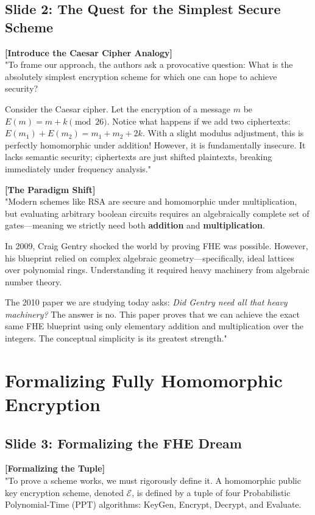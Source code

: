 \documentclass[11pt]{article}
\begin{document}
\subsection*{Slide 2: The Quest for the Simplest Secure Scheme}
\textbf{[Introduce the Caesar Cipher Analogy]} \\
"To frame our approach, the authors ask a provocative question: What is the absolutely simplest encryption scheme for which one can hope to achieve security? 

Consider the Caesar cipher. Let the encryption of a message $m$ be $E(m) = m + k \pmod{26}$. Notice what happens if we add two ciphertexts: $E(m_1) + E(m_2) = m_1 + m_2 + 2k$. With a slight modulus adjustment, this is perfectly homomorphic under addition! However, it is fundamentally insecure. It lacks semantic security; ciphertexts are just shifted plaintexts, breaking immediately under frequency analysis."

\textbf{[The Paradigm Shift]} \\
"Modern schemes like RSA are secure and homomorphic under multiplication, but evaluating arbitrary boolean circuits requires an algebraically complete set of gates---meaning we strictly need both \textbf{addition} and \textbf{multiplication}. 

In 2009, Craig Gentry shocked the world by proving FHE was possible. However, his blueprint relied on complex algebraic geometry---specifically, ideal lattices over polynomial rings. Understanding it required heavy machinery from algebraic number theory. 

The 2010 paper we are studying today asks: \textit{Did Gentry need all that heavy machinery?} The answer is no. This paper proves that we can achieve the exact same FHE blueprint using only elementary addition and multiplication over the integers. The conceptual simplicity is its greatest strength."

\section{Formalizing Fully Homomorphic Encryption}

\subsection*{Slide 3: Formalizing the FHE Dream}
\textbf{[Formalizing the Tuple]} \\
"To prove a scheme works, we must rigorously define it. A homomorphic public key encryption scheme, denoted $\mathcal{E}$, is defined by a tuple of four Probabilistic Polynomial-Time (PPT) algorithms: KeyGen, Encrypt, Decrypt, and Evaluate.
\end{document}
